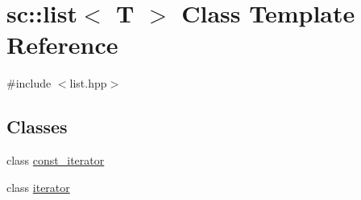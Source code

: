 \hypertarget{classsc_1_1list}{}\section{sc\+:\+:list$<$ T $>$ Class Template Reference}
\label{classsc_1_1list}


{\ttfamily \#include $<$list.\+hpp$>$}

\subsection*{Classes}
\begin{DoxyCompactItemize}
\item 
class \mbox{\hyperlink{classsc_1_1list_1_1const__iterator}{const\+\_\+iterator}}
\item 
class \mbox{\hyperlink{classsc_1_1list_1_1iterator}{iterator}}
\end{DoxyCompactItemize}
